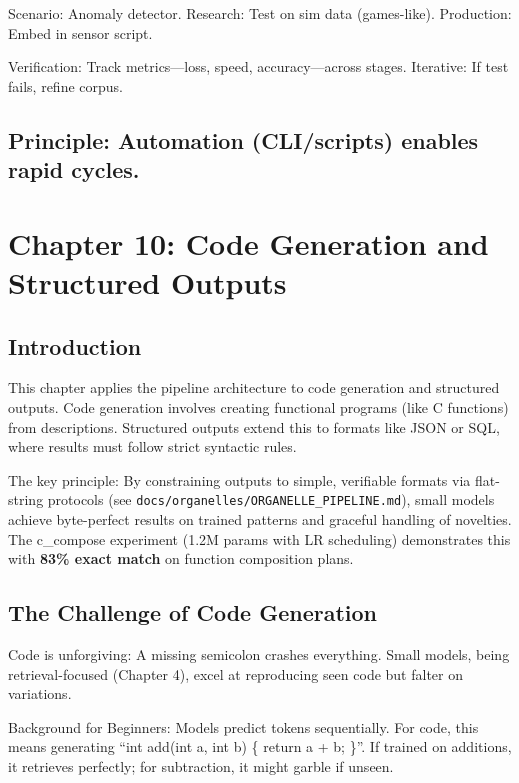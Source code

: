 \documentclass[
]{article}
\begin{document}
Scenario: Anomaly detector. Research: Test on sim data (games-like).
Production: Embed in sensor script.

Verification: Track metrics---loss, speed, accuracy---across stages.
Iterative: If test fails, refine corpus.

\subsection{Principle: Automation (CLI/scripts) enables rapid
cycles.}\label{principle-automation-cliscripts-enables-rapid-cycles.}

\section{Chapter 10: Code Generation and Structured
Outputs}\label{chapter-10-code-generation-and-structured-outputs}

\subsection{Introduction}\label{introduction-9}

This chapter applies the pipeline architecture to code generation and
structured outputs. Code generation involves creating functional
programs (like C functions) from descriptions. Structured outputs extend
this to formats like JSON or SQL, where results must follow strict
syntactic rules.

The key principle: By constraining outputs to simple, verifiable formats
via flat-string protocols (see
\texttt{docs/organelles/ORGANELLE\_PIPELINE.md}), small models achieve
byte-perfect results on trained patterns and graceful handling of
novelties. The c\_compose experiment (1.2M params with LR scheduling)
demonstrates this with \textbf{83\% exact match} on function composition
plans.

\subsection{The Challenge of Code
Generation}\label{the-challenge-of-code-generation}

Code is unforgiving: A missing semicolon crashes everything. Small
models, being retrieval-focused (Chapter 4), excel at reproducing seen
code but falter on variations.

Background for Beginners: Models predict tokens sequentially. For code,
this means generating ``int add(int a, int b) \{ return a + b; \}''. If
trained on additions, it retrieves perfectly; for subtraction, it might
garble if unseen.
\end{document}
